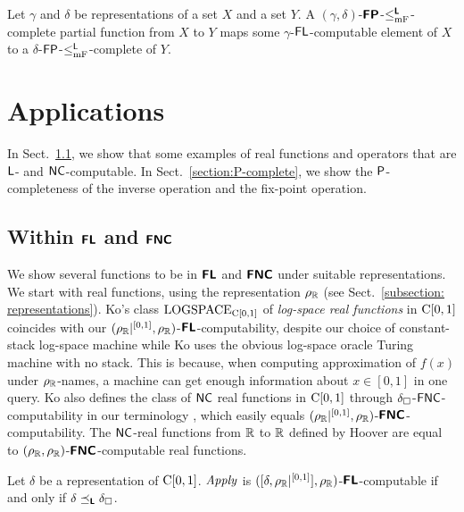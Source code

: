 \documentclass[envcountsame,orivec,oribibl]{llncs}
\begin{document}
\begin{lemma}
 \label{lemma:p-comp-maps-l-to-p-comp}
 Let $\gamma$ and $\delta$ be representations of a set $X$ and a set $Y$.
 A $(\gamma, \delta)$-$\text{\bfseries \sffamily \upshape FP}$-$\leq _{\mathrm{mF}} ^{\text{\bfseries \sffamily \upshape L}}$-complete partial function 
 from $X$ to $Y$ maps some $\gamma$-$\mathsf{FL}$-computable element of $X$
 to a $\delta$-$\mathsf{FP}$-$\leq _{\mathrm{mF}}^{\mathsf{L}}$-complete of $Y$.
\end{lemma}

\section{Applications}
\label{section:applications}

In Sect.~\ref{section:function}, 
we show that some examples of real functions and operators 
that are $\mathsf{L}$- and $\mathsf{NC}$-computable.
In Sect.~\ref{section:P-complete}, we show the $\mathsf{P}$-completeness of 
the inverse operation and the fix-point operation.

\subsection{Within $\text{\bfseries \sffamily \upshape FL}$ and $\text{\bfseries \sffamily \upshape FNC}$}
\label{section:function}

We show several functions to be 
in $\text{\bfseries \sffamily \upshape FL}$ and $\text{\bfseries \sffamily \upshape FNC}$
under suitable representations. 
We start with real functions, 
using the representation $\rho _\mathbb R$
(see Sect.~\ref{subsection: representations}). 
Ko's class $\mathrm{LOGSPACE}_{\mathrm C[0,1]}$ of
\emph{log-space real functions} in $\mathrm C[0,1]$ 
\cite{ko1991complexity} 
coincides with our $(\rho _\mathbb R|^{[0,1]}, \rho _\mathbb R)$-$\text{\bfseries \sffamily \upshape FL}$-computability, 
despite our choice of constant-stack log-space machine 
while Ko uses the obvious log-space oracle Turing machine 
with no stack.
This is because, 
when computing approximation of $f(x)$ under $\rho _\mathbb R$-names, 
a machine can get enough information about $x \in [0,1]$ in one query.
Ko also defines the class of $\mathsf{NC}$ real functions in $\mathrm C[0,1]$
through $\delta _\square$-$\mathsf{FNC}$-computability in our terminology 
\cite{ko1991complexity},
which easily equals $(\rho _\mathbb R|^{[0,1]}, \rho _\mathbb R)$-$\text{\bfseries \sffamily \upshape FNC}$-computability.
The $\mathsf{NC}$-real functions from $\mathbb R$ to $\mathbb R$ defined by Hoover \cite{hoover1991real}
are equal to $(\rho _\mathbb R, \rho _\mathbb R)$-$\text{\bfseries \sffamily \upshape FNC}$-computable real functions.

\begin{theorem}
 \label{theorem:apply-is-L-computable}
 Let $\delta$ be a representation of $\mathrm C[0, 1]$.
 $\mathit{Apply}$ is $([\delta, \rho _\mathbb R|^{[0,1]}], \rho _\mathbb R)$-$\text{\bfseries \sffamily \upshape FL}$-computable if
 and only if $\delta \preceq_{\text{\bfseries \sffamily \upshape L}} \delta _\square$.
\end{theorem}
\end{document}
